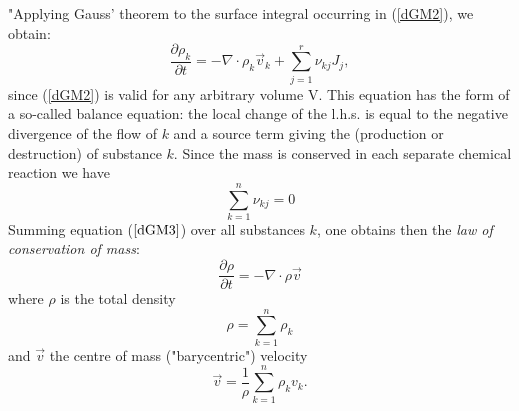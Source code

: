 "Applying Gauss' theorem to the surface integral occurring in (\ref{dGM2}), we obtain:
\begin{equation}
\frac{\partial \rho_k}{\partial t} = - \nabla \cdot \rho_k \vec{v}_k + \sum_{j=1}^r \nu_{kj} J_j,
\label{dGM3}
\end{equation}
since (\ref{dGM2}) is valid for any arbitrary volume V. This equation has the form of a so-called balance equation: the local change of the l.h.s. is equal to the negative divergence of the flow of $k$ and a source term giving the (production or destruction) of substance $k$.
Since the mass is conserved in each separate chemical reaction we have
\begin{equation}
\sum_{k=1}^n \nu_{kj}= 0 
\end{equation}
Summing equation ($\ref{dGM3}$) over all substances $k$, one obtains then the {\it law of conservation of mass}:
\begin{equation}
\frac{\partial \rho}{\partial t} = - \nabla \cdot \rho \vec{v}
\label{dGM5}
\end{equation}
where $\rho$ is the total density
\begin{equation}
\rho = \sum_{k=1}^n \rho_k
\end{equation}
and $\vec{v}$ the centre of mass ("barycentric") velocity
\begin{equation}
\vec{v} = \frac{1}{\rho} \sum_{k=1}^n \rho_k v_k.
\end{equation}
